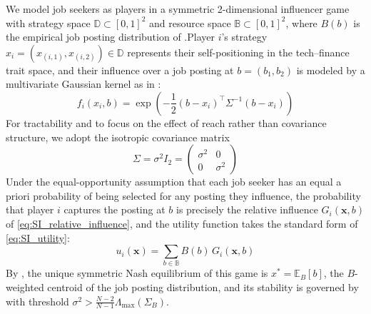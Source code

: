 \documentclass{article}
\begin{document}
        We model job seekers as players in a symmetric 2-dimensional influencer game with strategy space $\mathbb{D} \subset [0,1]^2$ and resource space $\mathbb{B} \subset [0,1]^2$, where $B(b)$ is the empirical job posting distribution of .Player $i$'s strategy $x_i = (x_{(i,1)}, x_{(i,2)}) \in \mathbb{D}$ represents their self-positioning in the tech--finance trait space, and their influence over a job posting at $b = (b_1, b_2)$ is modeled by a multivariate Gaussian kernel as in :
        \begin{equation}
            \label{eq:SI_linkedin_kernel}
            f_i(x_i, b) = \exp\!\left(-\frac{1}{2}(b - x_i)^\top \Sigma^{-1}(b - x_i)\right)
        \end{equation}
        For tractability and to focus on the effect of reach rather than covariance structure, we adopt the isotropic covariance matrix
        \begin{equation}
            \label{eq:SI_linkedin_sigma}
            \Sigma = \sigma^2 I_2
            = \begin{pmatrix}
                \sigma^2 & 0 \\
                0 & \sigma^2
            \end{pmatrix}
        \end{equation}
        Under the equal-opportunity assumption that each job seeker has an equal a priori probability of being selected for any posting they influence, the probability that player $i$ captures the posting at $b$ is precisely the relative influence $G_i(\mathbf{x}, b)$ of \cref{eq:SI_relative_influence}, and the utility function takes the standard form of \cref{eq:SI_utility}:
        \begin{equation}
            \label{eq:SI_linkedin_utility}
            u_i(\mathbf{x}) = \sum_{b \in \mathbb{B}} B(b)\, G_i(\mathbf{x}, b)
        \end{equation}
        By , the unique symmetric Nash equilibrium of this game is $x^* = \mathbb{E}_B[b]$, the $B$-weighted centroid of the job posting distribution, and its stability is governed by  with threshold $\sigma^2 > \frac{N-2}{N-1}\Lambda_{\max}(\Sigma_B)$.
\end{document}
